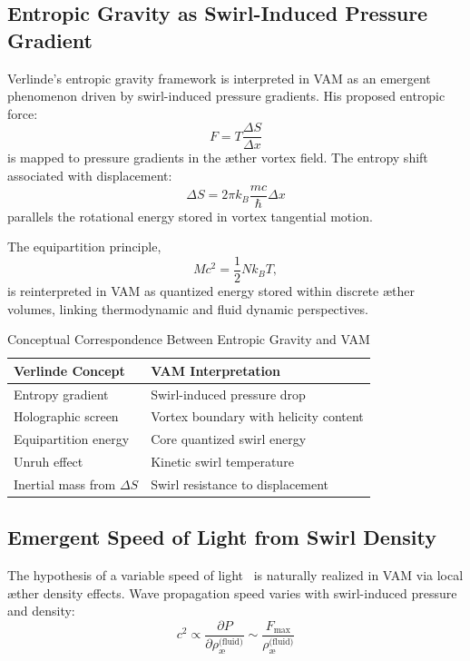 \documentclass[preprint]{revtex4-2}
\begin{document}
            \subsection{Entropic Gravity as Swirl-Induced Pressure Gradient}
            Verlinde's entropic gravity framework \cite{verlinde2010emergent} is interpreted in VAM as an emergent phenomenon driven by swirl-induced pressure gradients. His proposed entropic force:
            \[
                F = T \frac{\Delta S}{\Delta x}
            \]
            is mapped to pressure gradients in the æther vortex field. The entropy shift associated with displacement:
            \[
                \Delta S = 2\pi k_B \frac{mc}{\hbar} \Delta x
            \]
            parallels the rotational energy stored in vortex tangential motion.

            The equipartition principle,
            \[
                Mc^2 = \frac{1}{2} N k_B T,
            \]
            is reinterpreted in VAM as quantized energy stored within discrete æther volumes, linking thermodynamic and fluid dynamic perspectives.

            \begin{table}[H]
                \centering
                \footnotesize
                \caption{Conceptual Correspondence Between Entropic Gravity and VAM}
                \begin{tabular}{|l|l|}
                    \hline
                    \textbf{Verlinde Concept} & \textbf{VAM Interpretation} \\
                    \hline
                    Entropy gradient & Swirl-induced pressure drop \\
                    Holographic screen & Vortex boundary with helicity content \\
                    Equipartition energy & Core quantized swirl energy \\
                    Unruh effect & Kinetic swirl temperature \\
                    Inertial mass from $\Delta S$ & Swirl resistance to displacement \\
                    \hline
                \end{tabular}
            \end{table}

            \subsection*{Emergent Speed of Light from Swirl Density}
            The hypothesis of a variable speed of light~\cite{popescu2008cvar} is naturally realized in VAM via local æther density effects. Wave propagation speed varies with swirl-induced pressure and density:
            \[
                c^2 \propto \frac{\partial P}{\partial \rho_{\text{\ae}}^{\text{(fluid)}}} \sim \frac{F_\text{max}}{\rho_{\text{\ae}}^{\text{(fluid)}}}
            \]
\end{document}
